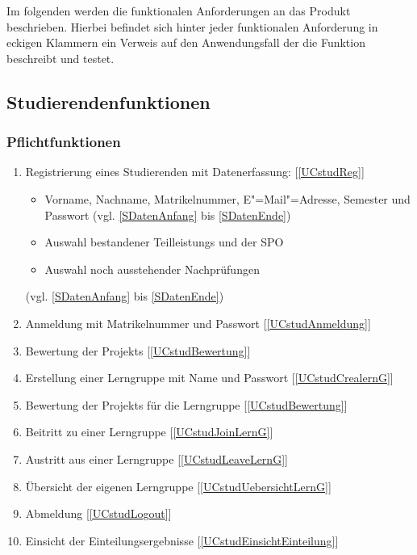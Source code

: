 \documentclass[parskip=full]{scrartcl}
\newcommand{\swtLabel}[1]{\textbf{/#1\arabic*0/}}
\newcommand{\testRef}[1]{[\ref{#1}]}
\begin{document}
Im folgenden werden die funktionalen Anforderungen an das Produkt beschrieben.
Hierbei befindet sich hinter jeder funktionalen Anforderung in eckigen Klammern
ein Verweis auf den Anwendungsfall der die Funktion beschreibt und testet.

\subsection{Studierendenfunktionen}

\subsubsection{Pflichtfunktionen}

\begin{enumerate}[label=\swtLabel{FA}]
  \item Registrierung eines Studierenden mit Datenerfassung: \testRef{UCstudReg}
  \label{FAregistrierung}
  \begin{itemize}
    \item Vorname, Nachname, Matrikelnummer, E"=Mail"=Adresse, Semester und
    Passwort (vgl. \ref{SDatenAnfang} bis \ref{SDatenEnde})
    \item Auswahl bestandener \glspl{Teilleistung} und der \gls{SPO}
    \item Auswahl noch ausstehender Nachprüfungen 
  \end{itemize}
  (vgl.  \ref{SDatenAnfang} bis \ref{SDatenEnde})
  \item Anmeldung mit Matrikelnummer und Passwort\label{FAStudanmeldung}
  \testRef{UCstudAnmeldung}
  \item Bewertung der \glspl{Projekt} \label{FAbewertung} \testRef{UCstudBewertung}
  \item Erstellung einer \gls{Lerngruppe} mit Name und Passwort
  \label{FAcreatelerng} \testRef{UCstudCrealernG}
  \item Bewertung der \glspl{Projekt} für die \gls{Lerngruppe} 
  \label{FAbewertung2} \testRef{UCstudBewertung}
  \item Beitritt zu einer \gls{Lerngruppe} \label{FAjoinLerng}
  \testRef{UCstudJoinLernG}
  \item Austritt aus einer \gls{Lerngruppe} \label{FAlergAustritt}
  \testRef{UCstudLeaveLernG}
  \item Übersicht der eigenen \gls{Lerngruppe} 
  \label{FAcheckLerng} \testRef{UCstudUebersichtLernG}
  \item Abmeldung \label{FAStudabmeldung} \testRef{UCstudLogout}
  \item Einsicht der Einteilungsergebnisse \label{FAStudeinsicht} \testRef{UCstudEinsichtEinteilung}
\end{enumerate}
\end{document}
